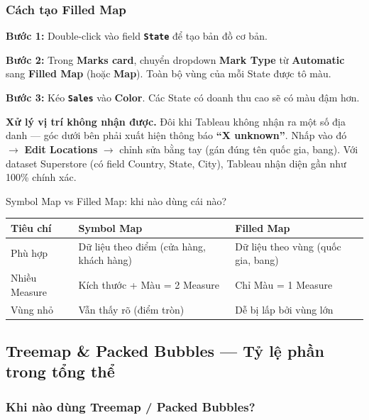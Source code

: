 \documentclass[12pt]{article}
\begin{document}
\subsubsection{Cách tạo Filled Map}

\noindent \textbf{Bước 1:} Double-click vào field \textbf{\texttt{State}} để tạo bản đồ cơ bản.

\noindent \textbf{Bước 2:} Trong \textbf{Marks card}, chuyển dropdown \textbf{Mark Type} từ \textbf{Automatic} sang \textbf{Filled Map} (hoặc \textbf{Map}). Toàn bộ vùng của mỗi State được tô màu.

\noindent \textbf{Bước 3:} Kéo \textbf{\texttt{Sales}} vào \textbf{Color}. Các State có doanh thu cao sẽ có màu đậm hơn.

\begin{notebox}
\textbf{Xử lý vị trí không nhận được.} Đôi khi Tableau không nhận ra một số địa danh --- góc dưới bên phải xuất hiện thông báo \textbf{``X unknown''}. Nhấp vào đó $\rightarrow$ \textbf{Edit Locations} $\rightarrow$ chỉnh sửa bằng tay (gán đúng tên quốc gia, bang). Với dataset Superstore (có field Country, State, City), Tableau nhận diện gần như 100\% chính xác.
\end{notebox}

\begin{guidelinebox}{Symbol Map vs Filled Map: khi nào dùng cái nào?}
\renewcommand{\arraystretch}{1.3}
\begin{tabularx}{\linewidth}{l X X}
\toprule
\textbf{Tiêu chí} & \textbf{Symbol Map} & \textbf{Filled Map} \\
\midrule
Phù hợp & Dữ liệu theo điểm (cửa hàng, khách hàng) & Dữ liệu theo vùng (quốc gia, bang) \\
Nhiều Measure & Kích thước + Màu = 2 Measure & Chỉ Màu = 1 Measure \\
Vùng nhỏ & Vẫn thấy rõ (điểm tròn) & Dễ bị lấp bởi vùng lớn \\
\bottomrule
\end{tabularx}
\end{guidelinebox}

\subsection{Treemap \& Packed Bubbles --- Tỷ lệ phần trong tổng thể}

\subsubsection{Khi nào dùng Treemap / Packed Bubbles?}
\end{document}

